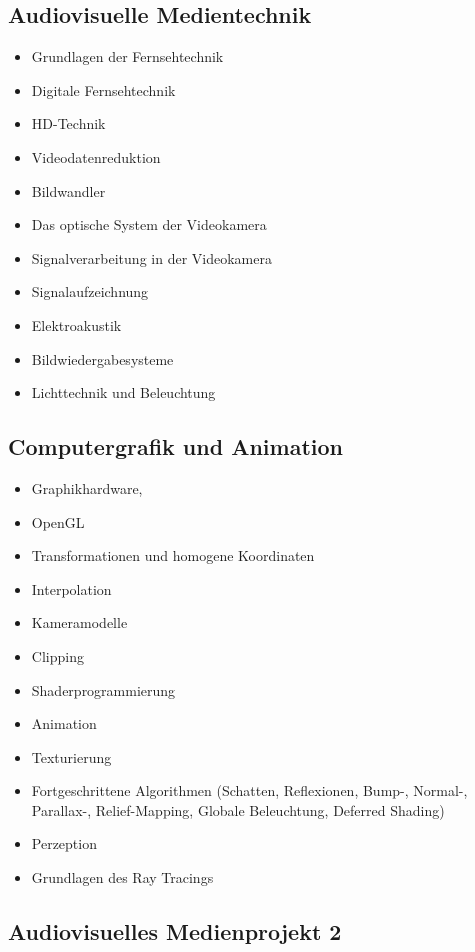 \subsection*{Audiovisuelle
Medientechnik}\label{audiovisuelle-medientechnik-1}

\begin{itemize}
\item
  Grundlagen der Fernsehtechnik
\item
  Digitale Fernsehtechnik
\item
  HD-Technik
\item
  Videodatenreduktion
\item
  Bildwandler
\item
  Das optische System der Videokamera
\item
  Signalverarbeitung in der Videokamera
\item
  Signalaufzeichnung
\item
  Elektroakustik
\item
  Bildwiedergabesysteme
\item
  Lichttechnik und Beleuchtung
\end{itemize}

\subsection*{Computergrafik und
Animation}\label{computergrafik-und-animation-1}

\begin{itemize}
\item
  Graphikhardware,
\item
  OpenGL
\item
  Transformationen und homogene Koordinaten
\item
  Interpolation
\item
  Kameramodelle
\item
  Clipping
\item
  Shaderprogrammierung
\item
  Animation
\item
  Texturierung
\item
  Fortgeschrittene Algorithmen (Schatten, Reflexionen, Bump-, Normal-,
  Parallax-, Relief-Mapping, Globale Beleuchtung, Deferred Shading)
\item
  Perzeption
\item
  Grundlagen des Ray Tracings
\end{itemize}

\subsection*{Audiovisuelles Medienprojekt
2}\label{audiovisuelles-medienprojekt-2-1}

